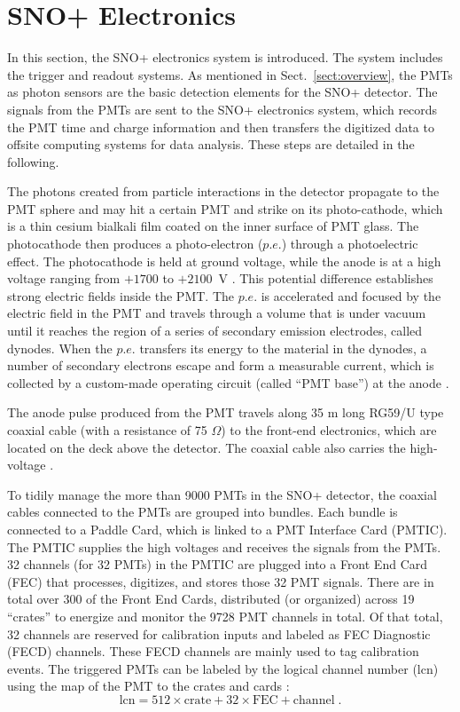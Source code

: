 \section{SNO+ Electronics}

In this section, the SNO+ electronics system is introduced. The system includes the trigger and readout systems. As mentioned in Sect.~\ref{sect:overview}, the PMTs as photon sensors are the basic detection elements for the SNO+ detector. The signals from the PMTs are sent to the SNO+ electronics system, which records the PMT time and charge information and then transfers the digitized data to offsite computing systems for data analysis. These steps are detailed in the following.

The photons created from particle interactions in the detector propagate to the PMT sphere and may hit a certain PMT and strike on its photo-cathode, which is a thin cesium bialkali film coated on the inner surface of PMT glass. The photocathode then produces a photo-electron ($p.e.$) through a photoelectric effect. The photocathode is held at ground voltage, while the anode is at a high voltage ranging from $+1700$ to $+2100$~V \cite{dunger2018topological,boger2000sudbury}. This potential difference establishes strong electric fields inside the PMT. The $p.e.$ is accelerated and focused by the electric field in the PMT and travels through a volume that is under vacuum until it reaches the region of a series of secondary emission electrodes, called dynodes. When the $p.e.$ transfers its energy to the material in the dynodes, a number of secondary electrons escape and form a measurable current, which is collected by a custom-made operating circuit (called ``PMT base'') at the anode \cite{hamamatsu2018photomultiplier}.

The anode pulse produced from the PMT travels along 35 m long RG59/U type coaxial cable (with a resistance of 75 $\Omega$) to the front-end electronics, which are located on the deck above the detector. The coaxial cable also carries the high-voltage \cite{boger2000sudbury}. 

To tidily manage the more than 9000 PMTs in the SNO+ detector, the coaxial cables connected to the PMTs are grouped into bundles. Each bundle is connected to a Paddle Card, which is linked to a PMT Interface Card (PMTIC). The PMTIC supplies the high voltages and receives the signals from the PMTs. 32 channels (for 32 PMTs) in the PMTIC are plugged into a Front End Card (FEC) that processes, digitizes, and stores those 32 PMT signals. There are in total over 300 of the Front End Cards, distributed (or organized) across 19 ``crates'' to energize and monitor the 9728 PMT channels in total. Of that total, 32 channels are reserved for calibration inputs and labeled as FEC Diagnostic (FECD) channels. These FECD channels are mainly used to tag calibration events. The triggered PMTs can be labeled by the logical channel number (lcn) using the map of the PMT to the crates and cards \cite{snop_jinst,stringer2019sensitivity}:
\begin{equation}
\mathrm{lcn = 512 \times crate + 32 \times FEC + channel}\; .
\end{equation}

